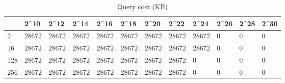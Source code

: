 \begin{table}
\caption{Query cost (KB)}
\label{tab:query_cost}
\begin{tabular}{llllllllllll}
\toprule
 & 2^{10} & 2^{12} & 2^{14} & 2^{16} & 2^{18} & 2^{20} & 2^{22} & 2^{24} & 2^{26} & 2^{28} & 2^{30} \\
\midrule
2 & 28672 & 28672 & 28672 & 28672 & 28672 & 28672 & 28672 & 28672 & 0 & 0 & 0 \\
16 & 28672 & 28672 & 28672 & 28672 & 28672 & 28672 & 28672 & 28672 & 0 & 0 & 0 \\
128 & 28672 & 28672 & 28672 & 28672 & 28672 & 28672 & 28672 & 0 & 0 & 0 & 0 \\
256 & 28672 & 28672 & 28672 & 28672 & 28672 & 28672 & 28672 & 0 & 0 & 0 & 0 \\
\bottomrule
\end{tabular}
\end{table}
